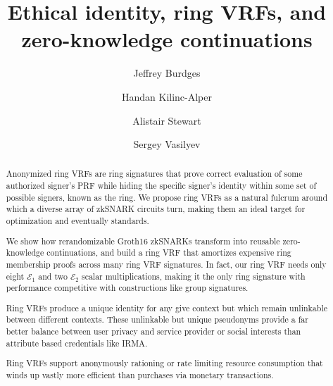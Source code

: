 \documentclass[runningheads,evcountsame,a4paper,11pt,orivec]{llncs}
\title{Ethical identity, ring VRFs, and zero-knowledge continuations}
\author{Jeffrey Burdges \and Handan Kilinc-Alper \and Alistair Stewart \and Sergey Vasilyev}
\date{}
\begin{document}
	
\maketitle

\begin{abstract}
Anonymized ring VRFs are ring signatures that prove correct evaluation of some authorized signer's PRF while hiding the specific signer's identity within some set of possible signers, known as the ring.  We propose ring VRFs as a natural fulcrum around which a diverse array of zkSNARK circuits turn, making them an ideal target for optimization and eventually standards.

\smallskip

We show how rerandomizable Groth16 zkSNARKs transform into reusable zero-knowledge continuations, and build a ring VRF that amortizes expensive ring membership proofs across many ring VRF signatures.
In  fact, our ring VRF needs only eight $\mathcal{E}_1$ and two $\mathcal{E}_2$ scalar multiplications, making it the only ring signature with performance competitive with constructions like group signatures.

\smallskip

Ring VRFs produce a unique identity for any give context but which remain unlinkable between different contexts.  These unlinkable but unique pseudonyms provide a far better balance between user privacy and service provider or social interests than attribute based credentials like IRMA.

\smallskip

Ring VRFs support anonymously rationing or rate limiting resource consumption that winds up vastly more efficient than purchases via monetary transactions. 
\end{abstract}




% 

















\end{document}
